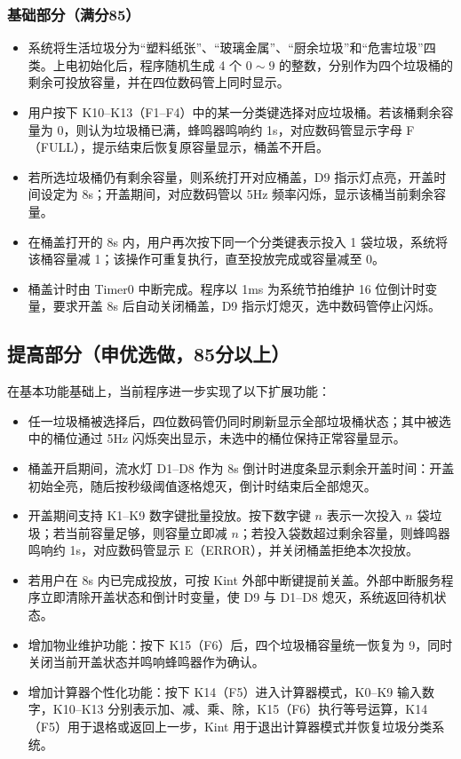 \documentclass[12pt,a4paper]{article}
\begin{document}
\subsubsection*{基础部分（满分85）}
\begin{itemize}
    \item 系统将生活垃圾分为“塑料纸张”、“玻璃金属”、“厨余垃圾”和“危害垃圾”四类。上电初始化后，程序随机生成 4 个 $0\sim9$ 的整数，分别作为四个垃圾桶的剩余可投放容量，并在四位数码管上同时显示。
    \item 用户按下 K10--K13（F1--F4）中的某一分类键选择对应垃圾桶。若该桶剩余容量为 0，则认为垃圾桶已满，蜂鸣器鸣响约 1s，对应数码管显示字母 F（FULL），提示结束后恢复原容量显示，桶盖不开启。
    \item 若所选垃圾桶仍有剩余容量，则系统打开对应桶盖，D9 指示灯点亮，开盖时间设定为 8s；开盖期间，对应数码管以 5Hz 频率闪烁，显示该桶当前剩余容量。
    \item 在桶盖打开的 8s 内，用户再次按下同一个分类键表示投入 1 袋垃圾，系统将该桶容量减 1；该操作可重复执行，直至投放完成或容量减至 0。
    \item 桶盖计时由 Timer0 中断完成。程序以 1ms 为系统节拍维护 16 位倒计时变量，要求开盖 8s 后自动关闭桶盖，D9 指示灯熄灭，选中数码管停止闪烁。
\end{itemize}

\subsection{提高部分（申优选做，85分以上）}
在基本功能基础上，当前程序进一步实现了以下扩展功能：
\begin{itemize}
    \item 任一垃圾桶被选择后，四位数码管仍同时刷新显示全部垃圾桶状态；其中被选中的桶位通过 5Hz 闪烁突出显示，未选中的桶位保持正常容量显示。
    \item 桶盖开启期间，流水灯 D1--D8 作为 8s 倒计时进度条显示剩余开盖时间：开盖初始全亮，随后按秒级阈值逐格熄灭，倒计时结束后全部熄灭。
    \item 开盖期间支持 K1--K9 数字键批量投放。按下数字键 $n$ 表示一次投入 $n$ 袋垃圾；若当前容量足够，则容量立即减 $n$；若投入袋数超过剩余容量，则蜂鸣器鸣响约 1s，对应数码管显示 E（ERROR），并关闭桶盖拒绝本次投放。
    \item 若用户在 8s 内已完成投放，可按 Kint 外部中断键提前关盖。外部中断服务程序立即清除开盖状态和倒计时变量，使 D9 与 D1--D8 熄灭，系统返回待机状态。
    \item 增加物业维护功能：按下 K15（F6）后，四个垃圾桶容量统一恢复为 9，同时关闭当前开盖状态并鸣响蜂鸣器作为确认。
    \item 增加计算器个性化功能：按下 K14（F5）进入计算器模式，K0--K9 输入数字，K10--K13 分别表示加、减、乘、除，K15（F6）执行等号运算，K14（F5）用于退格或返回上一步，Kint 用于退出计算器模式并恢复垃圾分类系统。
\end{itemize}
\end{document}
